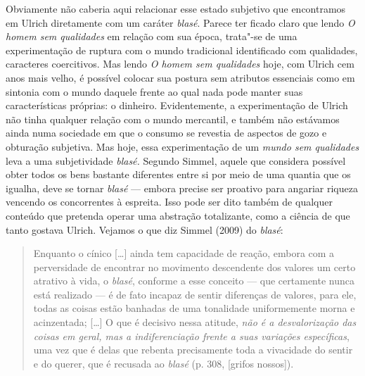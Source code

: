 Obviamente não caberia aqui relacionar esse estado subjetivo que
encontramos em Ulrich diretamente com um caráter \emph{blasé}. Parece
ter ficado claro que lendo \emph{O homem sem qualidades} em relação com
sua época, trata"-se de uma experimentação de ruptura com o mundo
tradicional identificado com qualidades, caracteres coercitivos. Mas
lendo \emph{O homem sem qualidades} hoje, com Ulrich cem anos mais
velho, é possível colocar sua postura sem atributos essenciais como em
sintonia com o mundo daquele frente ao qual nada pode manter suas
características próprias: o dinheiro. Evidentemente, a experimentação de
Ulrich não tinha qualquer relação com o mundo mercantil, e também não
estávamos ainda numa sociedade em que o consumo se revestia de aspectos
de gozo e obturação subjetiva. Mas hoje, essa experimentação de um
\emph{mundo sem qualidades} leva a uma subjetividade \emph{blasé.}
Segundo Simmel, aquele que considera possível obter todos os bens
bastante diferentes entre si por meio de uma quantia que os igualha,
deve se tornar \emph{blasé} --- embora precise ser proativo para angariar
riqueza vencendo os concorrentes à espreita. Isso pode ser dito também
de qualquer conteúdo que pretenda operar uma abstração totalizante, como
a ciência de que tanto gostava Ulrich. Vejamos o que diz Simmel (2009)
do \emph{blasé}:

\begin{quote}
Enquanto o cínico [\ldots{}] ainda tem capacidade de reação, embora
com a perversidade de encontrar no movimento descendente dos valores um
certo atrativo à vida, o \emph{blasé}, conforme a esse conceito --- que
certamente nunca está realizado --- é de fato incapaz de sentir
diferenças de valores, para ele, todas as coisas estão banhadas de uma
tonalidade uniformemente morna e acinzentada; [\ldots{}] O que é
decisivo nessa atitude, \emph{não é a desvalorização das coisas em
geral, mas a indiferenciação frente a suas variações específicas}, uma
vez que é delas que rebenta precisamente toda a vivacidade do sentir e
do querer, que é recusada ao \emph{blasé} (p. 308, [grifos nossos]).
\end{quote}

